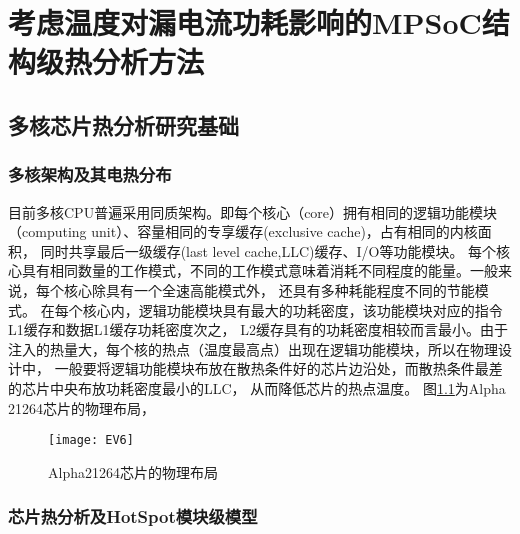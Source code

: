 

\chapter{考虑温度对漏电流功耗影响的MPSoC结构级热分析方法}
\label{cha:SSTA}


\section{多核芯片热分析研究基础}
\label{sec:SSTAbasic}

\subsection{多核架构及其电热分布}

目前多核CPU普遍采用同质架构。即每个核心（core）拥有相同的逻辑功能模块（computing unit）、容量相同的专享缓存(exclusive cache)，占有相同的内核面积， 同时共享最后一级缓存(last level cache,LLC)缓存、I/O等功能模块。 每个核心具有相同数量的工作模式，不同的工作模式意味着消耗不同程度的能量。一般来说，每个核心除具有一个全速高能模式外， 还具有多种耗能程度不同的节能模式。
在每个核心内，逻辑功能模块具有最大的功耗密度，该功能模块对应的指令L1缓存和数据L1缓存功耗密度次之， L2缓存具有的功耗密度相较而言最小。由于注入的热量大，每个核的热点（温度最高点）出现在逻辑功能模块，所以在物理设计中， 一般要将逻辑功能模块布放在散热条件好的芯片边沿处，而散热条件最差的芯片中央布放功耗密度最小的LLC， 从而降低芯片的热点温度。 图\ref{fig:ev6}为Alpha 21264芯片的物理布局，

\begin{figure}[H]
  \centering
  \texttt{[image: EV6]}
  \caption{Alpha21264芯片的物理布局}
  \label{fig:ev6}
\end{figure}


\subsection{芯片热分析及HotSpot模块级模型}

